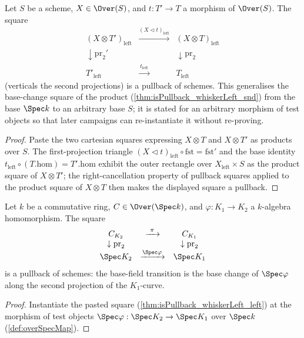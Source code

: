 \begin{theorem}
  \label{thm:isPullback_whiskerLeft_left}
  \leanok
  Let \(S\) be a scheme, \(X \in \Over(S)\), and \(t : T' \to T\) a morphism of
  \(\Over(S)\). The square
  \[
    \begin{array}{ccc}
      (X \otimes T')_{\mathrm{left}} & \xrightarrow{(X \lhd t)_{\mathrm{left}}} &
        (X \otimes T)_{\mathrm{left}} \\
      \downarrow \mathrm{pr}_2' & & \downarrow \mathrm{pr}_2 \\
      T'_{\mathrm{left}} & \xrightarrow{\ t_{\mathrm{left}}\ } & T_{\mathrm{left}}
    \end{array}
  \]
  (verticals the second projections) is a pullback of schemes. This generalises the
  base-change square of the product (\ref{thm:isPullback_whiskerLeft_snd}) from the base
  \(\Spec k\) to an arbitrary base \(S\); it is stated for an arbitrary morphism of test
  objects so that later campaigns can re-instantiate it without re-proving.
\end{theorem}
\begin{proof}
  \leanok
  Paste the two cartesian squares expressing \(X \otimes T\) and \(X \otimes T'\) as
  products over \(S\). The first-projection triangle
  \((X \lhd t)_{\mathrm{left}} \circ \mathrm{fst} = \mathrm{fst}'\) and the base identity
  \(t_{\mathrm{left}} \circ (T.\mathrm{hom}) = T'.\mathrm{hom}\) exhibit the outer
  rectangle over \(X_{\mathrm{left}} \times S\) as the product square of
  \(X \otimes T'\); the right-cancellation property of pullback squares applied to the
  product square of \(X \otimes T\) then makes the displayed square a pullback.
\end{proof}

\begin{theorem}
  \label{thm:isPullback_baseFieldTransition}
  \leanok
  Let \(k\) be a commutative ring, \(C \in \Over(\Spec k)\), and
  \(\varphi : K_1 \to K_2\) a \(k\)-algebra homomorphism. The square
  \[
    \begin{array}{ccc}
      C_{K_2} & \xrightarrow{\ \pi\ } & C_{K_1} \\
      \downarrow \mathrm{pr}_2 & & \downarrow \mathrm{pr}_2 \\
      \Spec K_2 & \xrightarrow{\Spec \varphi} & \Spec K_1
    \end{array}
  \]
  is a pullback of schemes: the base-field transition is the base change of
  \(\Spec\varphi\) along the second projection of the \(K_1\)-curve.
\end{theorem}
\begin{proof}
  \leanok
  Instantiate the pasted square (\ref{thm:isPullback_whiskerLeft_left}) at the morphism
  of test objects \(\Spec\varphi : \Spec K_2 \to \Spec K_1\) over \(\Spec k\)
  (\ref{def:overSpecMap}).
\end{proof}

